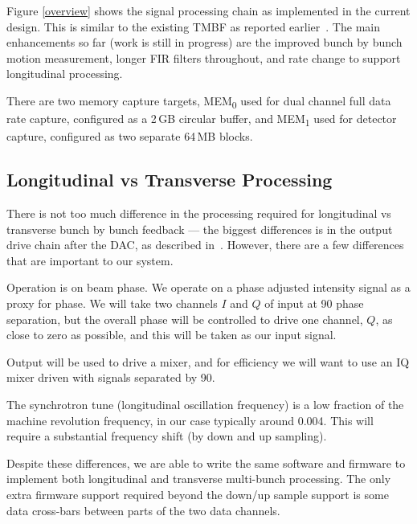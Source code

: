 \documentclass[
    a4paper,
    keeplastbox,            %
    hyphens,                %
    nospread,               %
]{jacow-2_1}
\begin{document}
Figure \ref{overview} shows the signal processing chain as implemented in the
current design.  This is similar to the existing TMBF as reported
earlier~\cite{icalepcs2015}.  The main enhancements so far (work is still in
progress) are the improved bunch by bunch motion measurement, longer FIR filters
throughout, and rate change to support longitudinal processing.

There are two memory capture targets, MEM\textsubscript0 used for dual channel
full data rate capture, configured as a 2\,GB circular buffer, and
MEM\textsubscript1 used for detector capture, configured as two separate 64\,MB
blocks.


\subsection{Longitudinal vs Transverse Processing}

There is not too much difference in the processing required for longitudinal vs
transverse bunch by bunch feedback --- the biggest differences is in the output
drive chain after the DAC, as described in~\cite{ibic2016}.  However, there are
a few differences that are important to our system.

\begin{Itemize}
\item
    Operation is on beam phase.  We operate on a phase adjusted intensity signal
    as a proxy for phase.  We will take two channels $I$ and $Q$ of input at
    90\textdegree{} phase separation, but the overall phase will be controlled
    to drive one channel, $Q$, as close to zero as possible, and this will be
    taken as our input signal.
\item
    Output will be used to drive a mixer, and for efficiency we will want to use
    an IQ mixer driven with signals separated by 90\textdegree{}.
\item
    The synchrotron tune (longitudinal oscillation frequency) is a low fraction
    of the machine revolution frequency, in our case typically around 0.004.
    This will require a substantial frequency shift (by down and up sampling).
\end{Itemize}

Despite these differences, we are able to write the same software and firmware
to implement both longitudinal and transverse multi-bunch processing.  The only
extra firmware support required beyond the down/up sample support is some data
cross-bars between parts of the two data channels.
\end{document}
